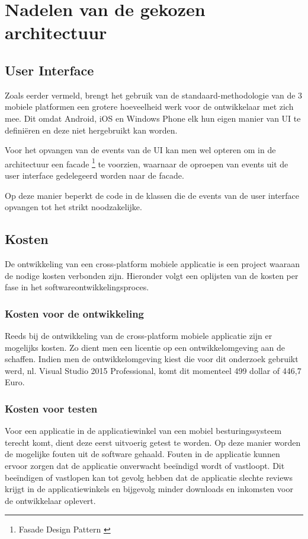 \label{sec:nadelenvandegekozenapparchitectuur}
\section{Nadelen van de gekozen architectuur}
\subsection{User Interface}
Zoals eerder vermeld, brengt het gebruik van de standaard-methodologie van de 3 mobiele platformen een grotere hoeveelheid
werk voor de ontwikkelaar met zich mee. Dit omdat Android, iOS en Windows Phone elk hun eigen manier van UI te definiëren en deze niet hergebruikt kan worden.

Voor het opvangen van de events van de UI kan men wel opteren om in de architectuur een facade \footnote{Fasade Design Pattern \cite{dofactorycom2017}} te voorzien, waarnaar de oproepen van events uit de user interface gedelegeerd worden naar de facade.

Op deze manier beperkt de code in de klassen die de events van de user interface opvangen tot het strikt noodzakelijke.
\label{sec:appkosten}
\subsection{Kosten}
De ontwikkeling van een cross-platform mobiele applicatie is een project waaraan de nodige kosten verbonden zijn.
Hieronder volgt een oplijsten van de kosten per fase in het softwareontwikkelingsproces.

\subsubsection{Kosten voor de ontwikkeling}
Reeds bij de ontwikkeling van de cross-platform mobiele applicatie zijn er mogelijks kosten. Zo dient men een licentie op een ontwikkelomgeving
aan de schaffen. Indien men de ontwikkelomgeving kiest die voor dit onderzoek gebruikt werd, nl. Visual Studio 2015 Professional,
komt dit momenteel 499 dollar of 446,7 Euro.

\subsubsection{Kosten voor testen}
Voor een applicatie in de applicatiewinkel van een mobiel besturingssysteem terecht komt, dient deze eerst uitvoerig getest te
worden. Op deze manier worden de mogelijke fouten uit de software gehaald. Fouten in de applicatie kunnen ervoor zorgen dat de applicatie
onverwacht beeïndigd wordt of vastloopt.
Dit beeïndigen of vastlopen kan tot gevolg hebben dat de applicatie slechte reviews krijgt in de applicatiewinkels en bijgevolg minder downloads en inkomsten voor de ontwikkelaar oplevert.

